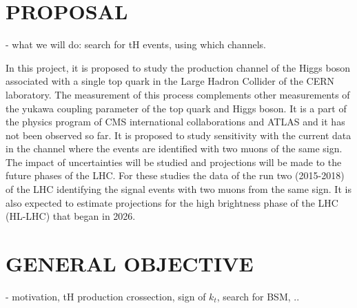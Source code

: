 \documentclass[final,3p]{CSP}
\begin{document}
\section{PROPOSAL}
- what we will do:  search for tH events, using which channels.

\onehalfspacing In this project, it is proposed to study the production channel of the Higgs boson associated 
with a single top quark in the Large Hadron Collider of the CERN laboratory. The measurement 
of this process complements other measurements of the yukawa coupling parameter of the top 
quark and Higgs boson. It is a part of the physics program of CMS international 
collaborations and ATLAS and it has not been observed so far. It is proposed to study 
sensitivity with the current data in the channel where the events are identified with two 
muons of the same sign. The impact of uncertainties will be studied and projections will be 
made to the future phases of the LHC. For these studies the data of the run two (2015-2018) 
of the LHC identifying the signal events with two muons from the same sign. It is also 
expected to estimate projections for the high brightness phase of the LHC (HL-LHC) that began 
in 2026. 

\section{GENERAL OBJECTIVE}
- motivation, tH production crossection, sign of $k_t$, search for BSM, ..
\end{document}

